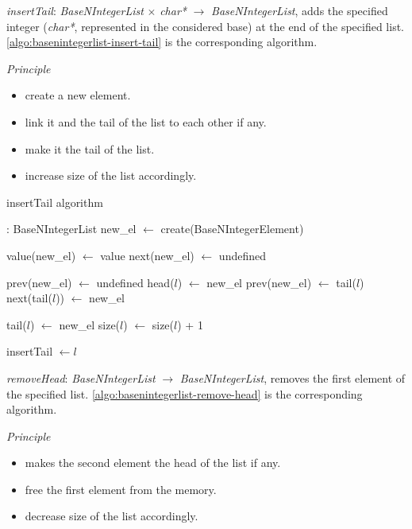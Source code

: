 \documentclass[book, nodocumentinfo]{upmethodology-document}
\begin{document}
\emph{insertTail}: \emph{BaseNIntegerList} \(\times\) \emph{char*} \(\rightarrow\) \emph{BaseNIntegerList},
adds the specified integer (\emph{char*}, represented in the considered base) at the end
of the specified list.
\ref{algo:basenintegerlist-insert-tail} is the corresponding algorithm.

\emph{Principle}
\begin{itemize}
    \item create a new element.
    \item link it and the tail of the list to each other if any.
    \item make it the tail of the list.
    \item increase size of the list accordingly.
\end{itemize}

\begin{algorithm}[H]
    \label{algo:basenintegerlist-insert-tail}
    \caption{insertTail algorithm}

    \begin{algorithmic}
         : BaseNIntegerList
            \State new\_el \(\leftarrow\) create(BaseNIntegerElement)

            \State value(new\_el) \(\leftarrow\) value
            \State next(new\_el) \(\leftarrow\) undefined

                \State prev(new\_el) \(\leftarrow\) undefined
                \State head(\(l\)) \(\leftarrow\) new\_el
            \Else
                \State prev(new\_el) \(\leftarrow\) tail(\(l\))
                \State next(tail(\(l\))) \(\leftarrow\) new\_el
            \EndIf

            \State tail(\(l\)) \(\leftarrow\) new\_el
            \State size(\(l\)) \(\leftarrow\) size(\(l\)) + 1

            \State insertTail \(\leftarrow l\)
        \EndFunction
    \end{algorithmic}
\end{algorithm}

\emph{removeHead}: \emph{BaseNIntegerList} \(\rightarrow\) \emph{BaseNIntegerList},
removes the first element of the specified list.
\ref{algo:basenintegerlist-remove-head} is the corresponding algorithm.

\emph{Principle}
\begin{itemize}
    \item makes the second element the head of the list if any.
    \item free the first element from the memory.
    \item decrease size of the list accordingly.
\end{itemize}
\end{document}
